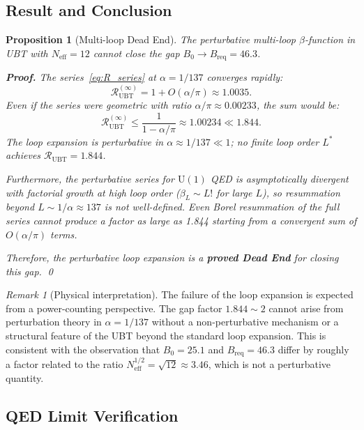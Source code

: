 \documentclass[11pt,a4paper]{article}
\newtheorem{proposition}{Proposition}
\theoremstyle{remark}
\newtheorem{remark}{Remark}
\begin{document}
\subsection{Result and Conclusion}

\begin{proposition}[Multi-loop Dead End]
\label{prop:multiloop_dead_end}
The perturbative multi-loop $\beta$-function in UBT with $N_{\mathrm{eff}} = 12$ cannot close
the gap $B_0 \to B_{\mathrm{req}} = 46.3$.

\textbf{Proof.}
The series~\eqref{eq:R_series} at $\alpha = 1/137$ converges rapidly:
\begin{equation}
  \mathcal{R}_{\mathrm{UBT}}^{(\infty)} = 1 + O(\alpha/\pi) \approx 1.0035.
\end{equation}
Even if the series were geometric with ratio $\alpha/\pi \approx 0.00233$, the sum would be:
\begin{equation}
  \mathcal{R}_{\mathrm{UBT}}^{(\infty)} \leq \frac{1}{1 - \alpha/\pi} \approx 1.00234 \ll 1.844.
\end{equation}
The loop expansion is perturbative in $\alpha \approx 1/137 \ll 1$; no finite loop order $L^*$ achieves
$\mathcal{R}_{\mathrm{UBT}} = 1.844$.

Furthermore, the perturbative series for $\mathrm{U}(1)$ QED is asymptotically divergent with
factorial growth at high loop order ($\beta_L \sim L!$ for large $L$), so resummation beyond
$L \sim 1/\alpha \approx 137$ is not well-defined. Even Borel resummation of the full series
cannot produce a factor as large as 1.844 starting from a convergent sum of $O(\alpha/\pi)$ terms.

Therefore, the perturbative loop expansion is a \textbf{proved Dead End} for closing this gap. \qed
\end{proposition}

\begin{remark}[Physical interpretation]
The failure of the loop expansion is expected from a power-counting perspective. The gap factor
$1.844 \sim 2$ cannot arise from perturbation theory in $\alpha = 1/137$ without a non-perturbative
mechanism or a structural feature of the UBT beyond the standard loop expansion. This is consistent
with the observation that $B_0 = 25.1$ and $B_{\mathrm{req}} = 46.3$ differ by roughly a factor
related to the ratio $N_{\mathrm{eff}}^{1/2} = \sqrt{12} \approx 3.46$, which is not a perturbative
quantity.
\end{remark}

\subsection{QED Limit Verification}
\end{document}

